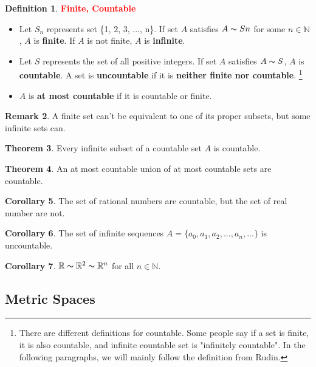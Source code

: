 \documentclass[12pt,a4paper]{article}
\theoremstyle{definition}
\newtheorem{thm}{Theorem}[subsection]
\newtheorem{dfn}[thm]{Definition}
\newtheorem{rmk}[thm]{Remark}
\newtheorem{cor}[thm]{Corollary}
\begin{document}
\begin{dfn} \textcolor{RED}{\bf Finite, Countable}
    \hspace{0em}
    \begin{itemize}
        \item Let $S_n$ represents set \{1, 2, 3, ..., n\}. If set $A$ satisfies $A \thicksim Sn$ for some $n \in \mathbb{N}$, $A$ is {\bf finite}. If $A$ is not finite, $A$ is {\bf infinite}.
        \item Let $S$ represents the set of all positive integers. If set $A$ satisfies $A \thicksim S$, $A$ is {\bf countable}.
        A set is {\bf uncountable} if it is {\bf neither finite nor countable}. \footnote{There are different definitions for countable. Some people say if a set is finite, it is also countable, and infinite countable set is "infinitely countable". In the following paragraphs, we will mainly follow the definition from Rudin.}
        \item $A$ is {\bf at most countable} if it is countable or finite.
    \end{itemize}
\end{dfn}

\begin {rmk} A finite set can't be equivalent to one of its proper subsets, but some infinite sets can.
\end {rmk}

\begin {thm} Every infinite subset of a countable set $A$ is countable. \end{thm}

\begin {thm} An at most countable union of at most countable sets are countable. \end{thm}

\begin {cor} The set of rational numbers are countable, but the set of real number are not. \end{cor}

\begin {cor} The set of infinite sequences $A = \{a_0, a_1, a_2, ..., a_n, ...\}$ is uncountable. \end{cor}

\begin {cor}
    $\mathbb{R} \thicksim \mathbb{R}^{2} \thicksim \mathbb{R}^{n}$ for all $n \in \mathbb{N}$. 
\end{cor}

\subsection{Metric Spaces}
\end{document}
